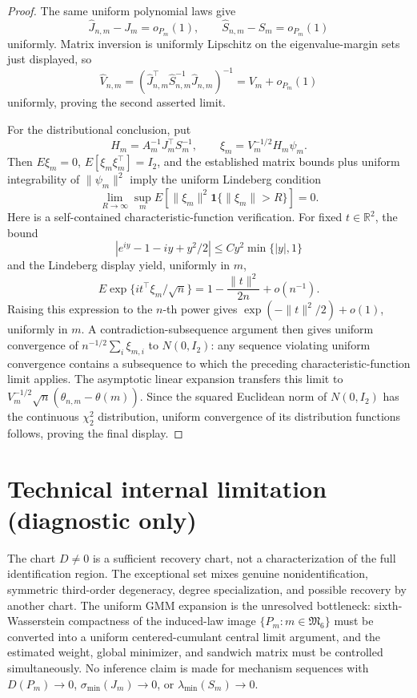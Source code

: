 \documentclass{article}
\begin{document}
\begin{proof}
The same uniform polynomial laws give
\[
\widehat J_{n,m}-J_m=o_{P_m}(1),
\qquad
\widehat S_{n,m}-S_m=o_{P_m}(1)
\]
uniformly. Matrix inversion is uniformly Lipschitz on the eigenvalue-margin sets just displayed, so
\[
\widehat V_{n,m}
=(\widehat J_{n,m}^\top\widehat S_{n,m}^{-1}\widehat J_{n,m})^{-1}
=V_m+o_{P_m}(1)
\]
uniformly, proving the second asserted limit.

For the distributional conclusion, put
\[
H_m=A_m^{-1}J_m^\top S_m^{-1},
\qquad
\xi_m=V_m^{-1/2}H_m\psi_m.
\]
Then \(E\xi_m=0\), \(E[\xi_m\xi_m^\top]=I_2\), and the established matrix bounds plus uniform integrability of \(\|\psi_m\|^2\) imply the uniform Lindeberg condition
\[
\lim_{R\to\infty}\sup_mE[\|\xi_m\|^2\mathbf1\{\|\xi_m\|>R\}]=0.
\]
Here is a self-contained characteristic-function verification. For fixed \(t\in\mathbb R^2\), the bound
\[
|e^{iy}-1-iy+y^2/2|\le C y^2\min\{|y|,1\}
\]
and the Lindeberg display yield, uniformly in \(m\),
\[
E\exp\{it^\top\xi_m/\sqrt n\}
=1-\frac{\|t\|^2}{2n}+o(n^{-1}).
\]
Raising this expression to the \(n\)-th power gives \(\exp(-\|t\|^2/2)+o(1)\), uniformly in \(m\). A contradiction-subsequence argument then gives uniform convergence of \(n^{-1/2}\sum_i\xi_{m,i}\) to \(N(0,I_2)\): any sequence violating uniform convergence contains a subsequence to which the preceding characteristic-function limit applies. The asymptotic linear expansion transfers this limit to \(V_m^{-1/2}\sqrt n(\widehat\theta_{n,m}-\theta(m))\). Since the squared Euclidean norm of \(N(0,I_2)\) has the continuous \(\chi^2_2\) distribution, uniform convergence of its distribution functions follows, proving the final display.
\end{proof}

\section*{Technical internal limitation (diagnostic only)}

The chart \(D\neq0\) is a sufficient recovery chart, not a characterization of the full identification region. The exceptional set mixes genuine nonidentification, symmetric third-order degeneracy, degree specialization, and possible recovery by another chart. The uniform GMM expansion is the unresolved bottleneck: sixth-Wasserstein compactness of the induced-law image \(\{P_m:m\in\mathfrak M_6\}\) must be converted into a uniform centered-cumulant central limit argument, and the estimated weight, global minimizer, and sandwich matrix must be controlled simultaneously. No inference claim is made for mechanism sequences with \(D(P_m)\to0\), \(\sigma_{\min}(J_m)\to0\), or \(\lambda_{\min}(S_m)\to0\).
\end{document}
